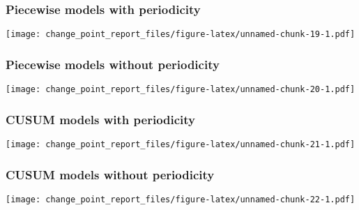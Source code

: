 \documentclass[
]{article}
\begin{document}
\hypertarget{piecewise-models-with-periodicity-1}{%
\subsubsection{Piecewise models with
periodicity}\label{piecewise-models-with-periodicity-1}}

\texttt{[image: change\_point\_report\_files/figure-latex/unnamed-chunk-19-1.pdf]}

\hypertarget{piecewise-models-without-periodicity-1}{%
\subsubsection{Piecewise models without
periodicity}\label{piecewise-models-without-periodicity-1}}

\texttt{[image: change\_point\_report\_files/figure-latex/unnamed-chunk-20-1.pdf]}

\hypertarget{cusum-models-with-periodicity-1}{%
\subsubsection{CUSUM models with
periodicity}\label{cusum-models-with-periodicity-1}}

\texttt{[image: change\_point\_report\_files/figure-latex/unnamed-chunk-21-1.pdf]}

\hypertarget{cusum-models-without-periodicity-1}{%
\subsubsection{CUSUM models without
periodicity}\label{cusum-models-without-periodicity-1}}

\texttt{[image: change\_point\_report\_files/figure-latex/unnamed-chunk-22-1.pdf]}
\end{document}
